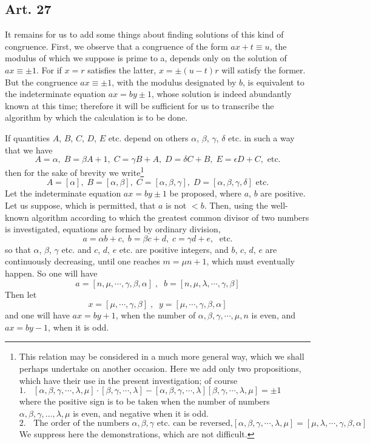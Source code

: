 \documentclass{book}
\theoremstyle{plain}
\theoremstyle{remark}
\begin{document}
\subsection*{Art. 27}

It remains for us to add some things about finding solutions of this kind of congruence.  First, we observe that a congruence of the form $ax+t \equiv u$, the modulus of which we suppose is prime to a, depends only on the solution of $ax \equiv \pm 1$.   For if $x=r$ satisfies the latter, $x = \pm (u-t)r$ will satisfy the former.   But the congruence $ax\equiv \pm 1$, with the modulus designated by $b$, is equivalent to the indeterminate equation $ax = by \pm 1$, whose solution is indeed abundantly known at this time; therefore it will be sufficient for us to transcribe the algorithm by which the calculation is to be done.

If quantities $A$, $B$, $C$, $D$, $E$ etc. depend on others $\alpha$, $\beta$, $\gamma$, $\delta$ etc. in such a way that we have 
\[ A = \alpha, \; B = \beta A + 1 , \; C = \gamma B + A, \; D = \delta C + B, \; E = \epsilon D + C, \textrm{ etc.} \]
then for the sake of brevity we write\footnote{This relation may be considered in a much more general way, which we shall perhaps undertake on another occasion.   Here we add only two propositions, which have their use in the present investigation; of course 
\[ \textrm{1.  } \;\; [\alpha,\beta,\gamma, \cdots, \lambda, \mu] \cdot [ \beta, \gamma, \cdots, \lambda] - [\alpha, \beta, \gamma, \cdots, \lambda] [\beta, \gamma, \cdots, \lambda, \mu] = \pm 1 \; \; \; \; \; \; \; \; \; \; \; \;\;\;\;\;\;\;\;\;\;\;\;\;\;\;\;\;\;\;\;\;\;\;\; \;\;\]
where the positive sign is to be taken when the number of numbers $\alpha,\beta,\gamma,\dots,\lambda,\mu$ is even, and negative when it is odd. 
\[ \textrm{2.  } \;\; \textrm{The order of the numbers }\alpha, \beta, \gamma\textrm{ etc. can be reversed,}  [\alpha,\beta,\gamma, \cdots, \lambda, \mu] = [\mu, \lambda, \cdots, \gamma, \beta, \alpha] \]
We suppress here the demonstrations, which are not difficult.
} 
\[ A = [\alpha], \; B = [\alpha,\beta], \; C = [\alpha, \beta, \gamma], \; D = [\alpha, \beta, \gamma, \delta] \textrm{ etc.} \]
Let the indeterminate equation $ax=by\pm1$ be proposed, where $a$, $b$ are positive.  Let us suppose, which is permitted, that $a$ is not $< b$.  Then, using the well-known algorithm according to which the greatest common divisor of two numbers is investigated, equations are formed by ordinary division,
\[ a = \alpha b + c, \; b = \beta c + d, \; c = \gamma d + e, \; \textrm{ etc.} \]
so that $\alpha$, $\beta$, $\gamma$ etc. and $c$, $d$, $e$ etc. are positive integers, and $b$, $c$, $d$, $e$ are continuously decreasing, until one reaches $m = \mu n + 1$, which must eventually happen.  So one will have
\[ a = [n,\mu, \cdots, \gamma, \beta, \alpha] \; , \; \; b = [n,\mu,\lambda, \cdots, \gamma,\beta] \]
Then let
\[ x = [\mu, \cdots, \gamma, \beta] \;, \; \; y = [\mu,\cdots,\gamma,\beta,\alpha] \]
and one will have $ax= by +1$, when the number of $\alpha, \beta, \gamma, \cdots, \mu, n$ is even, and $ax=by-1$, when it is odd.
\end{document}
